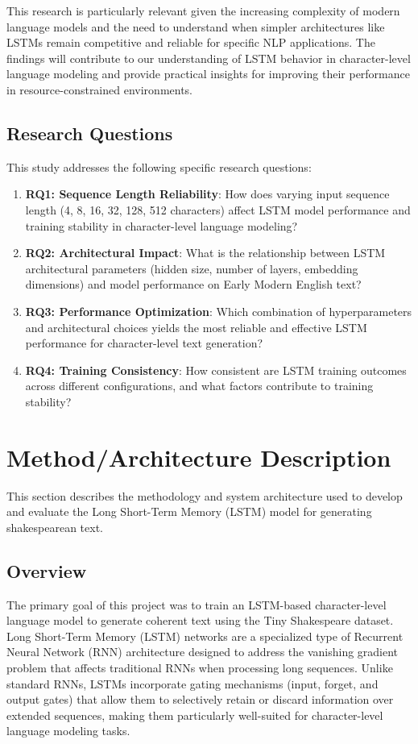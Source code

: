 \documentclass[12pt]{article}
\begin{document}
This research is particularly relevant given the increasing complexity of modern language models and the need to understand when simpler architectures like LSTMs remain competitive and reliable for specific NLP applications. The findings will contribute to our understanding of LSTM behavior in character-level language modeling and provide practical insights for improving their performance in resource-constrained environments.

\subsection{Research Questions}

This study addresses the following specific research questions:

\begin{enumerate}
    \item \textbf{RQ1: Sequence Length Reliability}: How does varying input sequence length (4, 8, 16, 32, 128, 512 characters) affect LSTM model performance and training stability in character-level language modeling?
    
    \item \textbf{RQ2: Architectural Impact}: What is the relationship between LSTM architectural parameters (hidden size, number of layers, embedding dimensions) and model performance on Early Modern English text?
    
    \item \textbf{RQ3: Performance Optimization}: Which combination of hyperparameters and architectural choices yields the most reliable and effective LSTM performance for character-level text generation?
    
    \item \textbf{RQ4: Training Consistency}: How consistent are LSTM training outcomes across different configurations, and what factors contribute to training stability?
\end{enumerate}

\section{Method/Architecture Description}
\label{sec:method}

This section describes the methodology and system architecture used to develop and evaluate the Long Short-Term Memory (LSTM) model for generating shakespearean text. 

\subsection{Overview}
The primary goal of this project was to train an LSTM-based character-level language model to generate coherent text using the Tiny Shakespeare dataset. Long Short-Term Memory (LSTM) networks are a specialized type of Recurrent Neural Network (RNN) architecture designed to address the vanishing gradient problem that affects traditional RNNs when processing long sequences. Unlike standard RNNs, LSTMs incorporate gating mechanisms (input, forget, and output gates) that allow them to selectively retain or discard information over extended sequences, making them particularly well-suited for character-level language modeling tasks.
\end{document}
